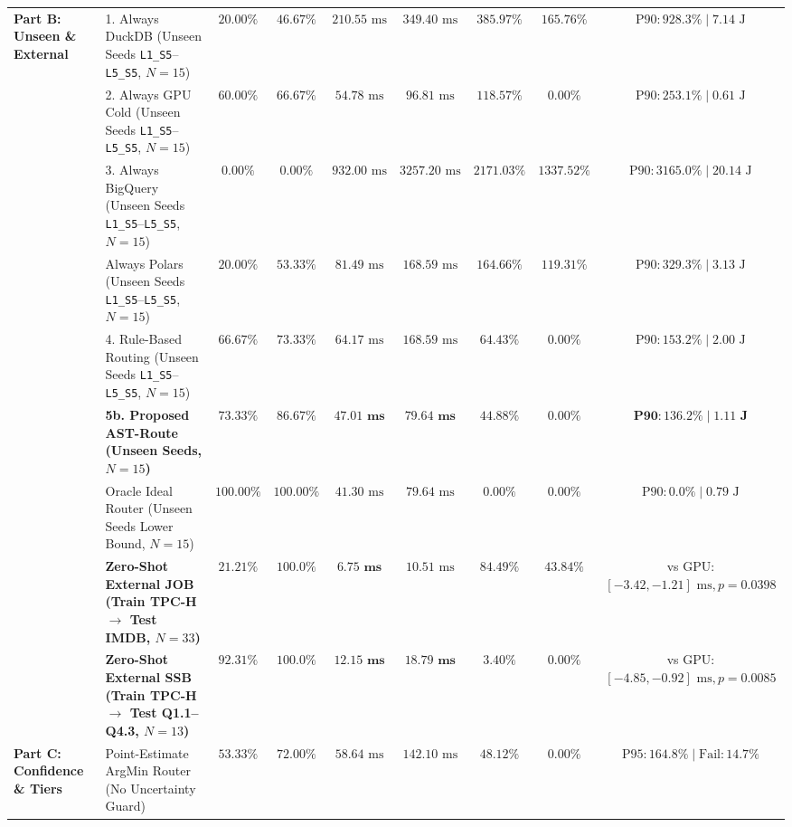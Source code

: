 \documentclass[10pt,a4paper]{article}
\begin{document}
\begin{table}[!t]
\begin{tabular}{@{}llccccccc@{}}
\midrule
\multirow{9}{*}{\textbf{Part B: Unseen \& External}}
 & 1. Always DuckDB (Unseen Seeds \texttt{L1\_S5}--\texttt{L5\_S5}, $N=15$) & $20.00\%$ & $46.67\%$ & $210.55\text{ ms}$ & $349.40\text{ ms}$ & $385.97\%$ & $165.76\%$ & $\text{P90}: 928.3\% \mid 7.14\text{ J}$ \\
 & 2. Always GPU Cold (Unseen Seeds \texttt{L1\_S5}--\texttt{L5\_S5}, $N=15$) & $60.00\%$ & $66.67\%$ & $54.78\text{ ms}$ & $96.81\text{ ms}$ & $118.57\%$ & $0.00\%$ & $\text{P90}: 253.1\% \mid 0.61\text{ J}$ \\
 & 3. Always BigQuery (Unseen Seeds \texttt{L1\_S5}--\texttt{L5\_S5}, $N=15$) & $0.00\%$ & $0.00\%$ & $932.00\text{ ms}$ & $3257.20\text{ ms}$ & $2171.03\%$ & $1337.52\%$ & $\text{P90}: 3165.0\% \mid 20.14\text{ J}$ \\
 & Always Polars (Unseen Seeds \texttt{L1\_S5}--\texttt{L5\_S5}, $N=15$) & $20.00\%$ & $53.33\%$ & $81.49\text{ ms}$ & $168.59\text{ ms}$ & $164.66\%$ & $119.31\%$ & $\text{P90}: 329.3\% \mid 3.13\text{ J}$ \\
 & 4. Rule-Based Routing (Unseen Seeds \texttt{L1\_S5}--\texttt{L5\_S5}, $N=15$) & $66.67\%$ & $73.33\%$ & $64.17\text{ ms}$ & $168.59\text{ ms}$ & $64.43\%$ & $0.00\%$ & $\text{P90}: 153.2\% \mid 2.00\text{ J}$ \\
 & \textbf{5b. Proposed AST-Route (Unseen Seeds, $N=15$)} & $\mathbf{73.33\%}$ & $\mathbf{86.67\%}$ & $\mathbf{47.01\text{ ms}}$ & $\mathbf{79.64\text{ ms}}$ & $\mathbf{44.88\%}$ & $\mathbf{0.00\%}$ & $\mathbf{\text{P90}: 136.2\% \mid 1.11\text{ J}}$ \\
 & Oracle Ideal Router (Unseen Seeds Lower Bound, $N=15$) & $100.00\%$ & $100.00\%$ & $41.30\text{ ms}$ & $79.64\text{ ms}$ & $0.00\%$ & $0.00\%$ & $\text{P90}: 0.0\% \mid 0.79\text{ J}$ \\
 & \textbf{Zero-Shot External JOB (Train TPC-H $\rightarrow$ Test IMDB, $N=33$)} & $21.21\%$ & $\mathbf{100.0\%}$ & $\mathbf{6.75\text{ ms}}$ & $10.51\text{ ms}$ & $84.49\%$ & $43.84\%$ & vs GPU: $[-3.42,-1.21]\text{ ms}, p=0.0398$ \\
 & \textbf{Zero-Shot External SSB (Train TPC-H $\rightarrow$ Test Q1.1--Q4.3, $N=13$)} & $\mathbf{92.31\%}$ & $\mathbf{100.0\%}$ & $\mathbf{12.15\text{ ms}}$ & $\mathbf{18.79\text{ ms}}$ & $\mathbf{3.40\%}$ & $\mathbf{0.00\%}$ & vs GPU: $[-4.85,-0.92]\text{ ms}, p=0.0085$ \\
\midrule
\multirow{5}{*}{\textbf{Part C: Confidence \& Tiers}}
 & Point-Estimate ArgMin Router (No Uncertainty Guard) & $53.33\%$ & $72.00\%$ & $58.64\text{ ms}$ & $142.10\text{ ms}$ & $48.12\%$ & $0.00\%$ & $\text{P95}: 164.8\% \mid \text{Fail}: 14.7\%$ \\

\end{tabular}
\end{table}
\end{document}
